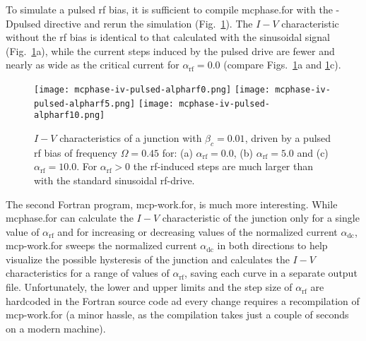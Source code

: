 To simulate a pulsed rf bias, it is sufficient to compile \textsf{mcphase.for} with the \textsf{-Dpulsed} directive and rerun the simulation (Fig.~\ref{fig:mcphase-iv-pulsed}). 
The $I - V$ characteristic without the rf bias is identical to that calculated with the sinusoidal signal (Fig.~\ref{fig:mcphase-iv-pulsed}a), while the current steps induced by the pulsed drive are fewer and nearly as wide as the critical current for $\alpha_\mathrm{rf} = 0.0$ (compare Figs.~\ref{fig:mcphase-iv-pulsed}a and \ref{fig:mcphase-iv-pulsed}c).


\begin{figure}[bh]
{
	\fboxsep=0pt
	\mbox{\texttt{[image: mcphase-iv-pulsed-alpharf0.png]}}
	\hfill
	\mbox{\texttt{[image: mcphase-iv-pulsed-alpharf5.png]}}
	\hfill
	\mbox{\texttt{[image: mcphase-iv-pulsed-alpharf10.png]}}
}
	\caption{$I - V$ characteristics of a junction with $\beta_c = 0.01$, driven by a pulsed rf bias of frequency $\Omega = 0.45$ for: (a) $\alpha_\mathrm{rf} = 0.0$, (b) $\alpha_\mathrm{rf} = 5.0$ and (c) $\alpha_\mathrm{rf} = 10.0$. For $\alpha_\mathrm{rf} > 0$ the rf-induced steps are much larger than with the standard sinusoidal rf-drive.}
	\label{fig:mcphase-iv-pulsed}
\end{figure}


The second Fortran program, \textsf{mcp-work.for}, is much more interesting. While \textsf{mcphase.for} can calculate the $I - V$ characteristic of the junction only for a single value of $\alpha_\mathrm{rf}$ and for increasing or decreasing values of the normalized current $\alpha_\mathrm{dc}$, \textsf{mcp-work.for} sweeps the normalized current $\alpha_\mathrm{dc}$ in both directions to help visualize the possible hysteresis of the junction and calculates the $I - V$ characteristics for a range of values of $\alpha_\mathrm{rf}$, saving each curve in a separate output file. Unfortunately, the lower and upper limits and the step size of $\alpha_\mathrm{rf}$ are hardcoded in the Fortran source code ad every change requires a recompilation of \textsf{mcp-work.for} (a minor hassle, as the compilation takes just a couple of seconds on a modern machine).


